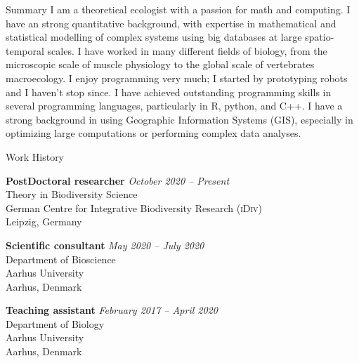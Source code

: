 \documentclass{resume} %
\begin{document}
\begin{rSection}{Summary}
I am a theoretical ecologist with a passion for math and computing.
I have an strong quantitative background, with expertise in mathematical and statistical modelling of complex systems using big databases at large spatio-temporal scales.
I have worked in many different fields of biology, from the microscopic scale of muscle physiology to the global scale of vertebrates macroecology.
I enjoy programming very much; I started by prototyping robots and I haven't stop since.
I have achieved outstanding programming skills in several programming languages, particularly in R, python, and C++.
I have a strong background in using Geographic Information Systems (GIS), especially in optimizing large computations or performing complex data analyses.
\end{rSection}

\begin{rSection}{Work History}

{\bf PostDoctoral researcher} \hfill {\em October 2020 -- Present}\\
Theory in Biodiversity Science\\
German Centre for Integrative Biodiversity Research (\textsc{iDiv})\\
Leipzig, Germany

{\bf Scientific consultant} \hfill {\em May 2020 -- July 2020}\\
Department of Bioscience\\
Aarhus University\\
Aarhus, Denmark

{\bf Teaching assistant} \hfill {\em February 2017 -- April 2020}
\\Department of Biology\\
Aarhus University\\
Aarhus, Denmark

\end{rSection}
\end{document}
